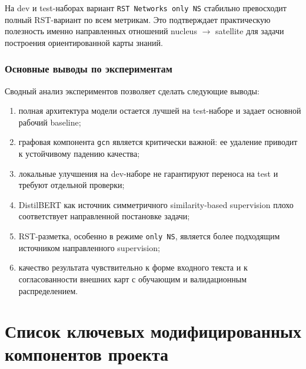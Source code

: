 \documentclass[12pt,a4paper]{article}
\begin{document}
На dev и test-наборах вариант \texttt{RST Networks only NS} стабильно превосходит полный RST-вариант по всем метрикам. Это подтверждает практическую полезность именно направленных отношений nucleus $\rightarrow$ satellite для задачи построения ориентированной карты знаний.

\subsubsection{Основные выводы по экспериментам}

Сводный анализ экспериментов позволяет сделать следующие выводы:

\begin{enumerate}
    \item полная архитектура модели остается лучшей на test-наборе и задает основной рабочий baseline;
    \item графовая компонента \texttt{gcn} является критически важной: ее удаление приводит к устойчивому падению качества;
    \item локальные улучшения на dev-наборе не гарантируют переноса на test и требуют отдельной проверки;
    \item DistilBERT как источник симметричного similarity-based supervision плохо соответствует направленной постановке задачи;
    \item RST-разметка, особенно в режиме \texttt{only NS}, является более подходящим источником направленного supervision;
    \item качество результата чувствительно к форме входного текста и к согласованности внешних карт с обучающим и валидационным распределением.
\end{enumerate}

\section{Список ключевых модифицированных компонентов проекта}
\end{document}
